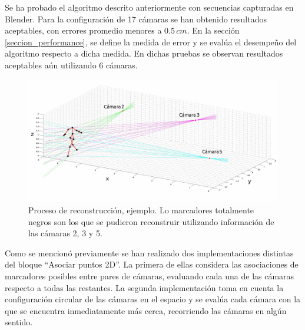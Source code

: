 Se ha probado el algoritmo descrito anteriormente con secuencias capturadas en Blender. Para la configuración de 17 cámaras se han obtenido resultados aceptables,  con errores promedio menores a $0.5\,cm$. En la sección \ref{seccion_performance}, se define la medida de error  y se evalúa el desempeño del algoritmo respecto a dicha medida. En dichas pruebas se observan resultados aceptables aún utilizando 6 cámaras.

\begin{figure}[h!]
\centering
\captionsetup{justification=centering,margin=2.8cm}
\includegraphics[scale=0.5]{img/Reconstruccion/Reconstruccion_3_camaras2.jpg}
\caption{Proceso de reconstrucción, ejemplo. Lo marcadores totalmente negros son los que se pudieron reconstruir utilizando información de las cámaras 2, 3 y 5.}
\end{figure}


Como se mencionó previamente se han realizado dos implementaciones distintas del bloque  “Asociar puntos 2D”. La primera de ellas considera las asociaciones de marcadores posibles entre pares de cámaras, evaluando cada una de las cámaras respecto a todas las restantes.  La segunda implementación toma en cuenta  la configuración circular de las cámaras en el espacio y se evalúa cada cámara con la que se encuentra inmediatamente más cerca,  recorriendo las cámaras en algún sentido.

